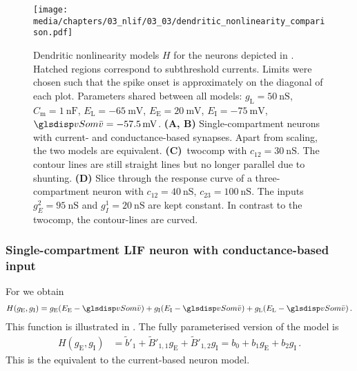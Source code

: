 \begin{figure}
	\texttt{[image: media/chapters/03\_nlif/03\_03/dendritic\_nonlinearity\_comparison.pdf]}%
	{\label{fig:dendritic_nonlinearity_comparison_a}}%
	{\label{fig:dendritic_nonlinearity_comparison_b}}%
	{\label{fig:dendritic_nonlinearity_comparison_c}}%
	{\label{fig:dendritic_nonlinearity_comparison_d}}%
	\caption[Dendritic nonlinearity models $H$ for different $n$-LIF neurons]{Dendritic nonlinearity models $H$ for the \nlif neurons depicted in . Hatched regions correspond to subthreshold currents. Limits were chosen such that the spike onset is approximately on the diagonal of each plot.
	Parameters shared between all models: $g_\mathrm{L} = \SI{50}{\nano\siemens}$, $C_\mathrm{m} = \SI{1}{\nano\farad}$, $E_\mathrm{L} = \SI{-65}{\milli\volt}$, $E_\mathrm{E} = \SI{20}{\milli\volt}$, $E_\mathrm{I} = \SI{-75}{\milli\volt}$, $\vSom = \SI{-57.5}{\milli\volt}$.
	\textbf{(A, B)} Single-compartment neurons with current- and conductance-based synapses. Apart from scaling, the two models are equivalent.
	\textbf{(C)}~\Gls{twocomp} with $c_\mathrm{12} = \SI{30}{\nano\siemens}$. The contour lines are still straight lines but no longer parallel due to shunting.
	\textbf{(D)} Slice through the response curve of a three-compartment \LIF neuron with $c_\mathrm{12} = \SI{40}{\nano\siemens}$, $c_\mathrm{23} = \SI{100}{\nano\siemens}$. The inputs $g_E^2 = \SI{95}{\nano\siemens}$ and $g_I^1 = \SI{20}{\nano\siemens}$ are kept constant. In contrast to the \gls{twocomp}, the contour-lines are curved.
	}
\end{figure}


\subsubsection{Single-compartment LIF neuron with conductance-based input}
For  we obtain
\begin{align*}
	H(g_\mathrm{E}, g_\mathrm{I}) = g_\mathrm{E} (E_\mathrm{E} - \vSom) + g_\mathrm{I} (E_\mathrm{I} - \vSom) + g_\mathrm{L}(E_\mathrm{L} - \vSom) \,.
\end{align*}
This function is illustrated in .
The fully parameterised version of the model is
\begin{align*}
	H(g_\mathrm{E}, g_\mathrm{I}) &= \tilde b'_1 + \tilde B'_{1, 1} g_\mathrm{E} + \tilde B'_{1, 2} g_\mathrm{I} = b_0 + b_1 g_\mathrm{E} + b_2 g_\mathrm{I} \,.
\end{align*}
This is the equivalent to the current-based neuron model.

